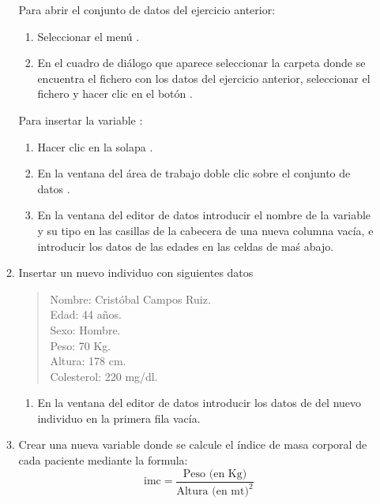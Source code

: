 \begin{enumerate}[leftmargin=*]
\begin{enumerate}
\begin{indicacion} 
Para abrir el conjunto de datos del ejercicio anterior:
\begin{enumerate}
\item Seleccionar el menú .
\item En el cuadro de diálogo que aparece seleccionar la carpeta donde se encuentra el fichero con los datos del ejercicio anterior,
seleccionar el fichero y hacer clic en el botón .
\end{enumerate}
Para insertar la variable :
\begin{enumerate}
\item Hacer clic en la solapa .
\item En la ventana del área de trabajo doble clic sobre el conjunto de datos .
\item En la ventana del editor de datos introducir el nombre de la variable  y su tipo en las casillas de la cabecera de una nueva columna vacía, e introducir los datos de las edades en las celdas de maś abajo. 
\end{enumerate}
\end{indicacion}

\item Insertar un nuevo individuo con siguientes datos
\begin{quote}
Nombre: Cristóbal Campos Ruiz.\\
Edad: 44 años.\\
Sexo: Hombre.\\
Peso: 70 Kg.\\
Altura: 178 cm.\\
Colesterol: 220 mg/dl.
\end{quote}

\begin{indicacion}
\begin{enumerate}
\item En la ventana del editor de datos introducir los datos de del nuevo individuo en la primera fila vacía.
\end{enumerate}
\end{indicacion}

\item Crear una nueva variable donde se calcule el índice de masa corporal de cada paciente mediante la formula:
\[
\text{imc} = \frac{\text{Peso (en Kg)}}{\text{Altura (en mt)}^2}
\]


\end{enumerate}
\end{enumerate}
